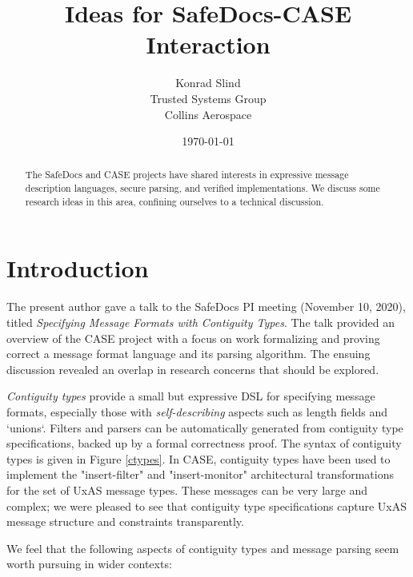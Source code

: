 \documentclass{article}
\theoremstyle{definition}
\begin{document}
\title{Ideas for SafeDocs-CASE Interaction}
\author{Konrad Slind \\ Trusted Systems Group \\ Collins Aerospace}
\date{\today}

\begin{abstract}
The SafeDocs and CASE projects have shared interests in expressive
message description languages, secure parsing, and verified
implementations. We discuss some research ideas in this area,
confining ourselves to a technical discussion.
\end{abstract}

\maketitle

\section*{Introduction}

The present author gave a talk to the SafeDocs PI meeting (November
10, 2020), titled \emph{Specifying Message Formats with Contiguity
  Types}. The talk provided an overview of the CASE project with a
focus on work formalizing and proving correct a message format
language and its parsing algorithm. The ensuing discussion revealed an
overlap in research concerns that should be explored.

\emph{Contiguity types} provide a small but expressive DSL for
specifying message formats, especially those with
\emph{self-describing} aspects such as length fields and
`unions`. Filters and parsers can be automatically generated from
contiguity type specifications, backed up by a formal correctness
proof. The syntax of contiguity types is given in Figure \ref{ctypes}.
In CASE, contiguity types have been used to implement the
"insert-filter" and "insert-monitor" architectural transformations for
the set of UxAS message types. These messages can be very large and
complex; we were pleased to see that contiguity type specifications
capture UxAS message structure and constraints transparently.

We feel that the following aspects of contiguity types and message
parsing seem worth pursuing in wider contexts:
\end{document}
